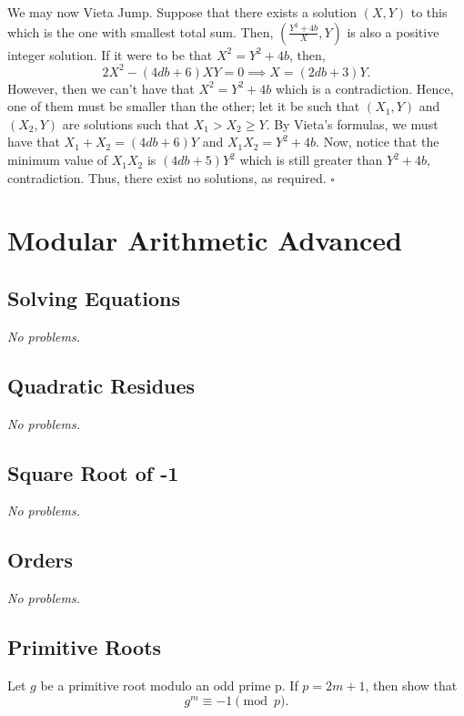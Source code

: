 \documentclass{article}
\newcommand{\noproblems}{\emph{No problems.}}
\begin{document}
We may now Vieta Jump. Suppose that there exists a solution $(X, Y)$ to this which is the one with smallest total sum. Then, $\left(\tfrac{Y^2+4b}{X}, Y\right)$ is also a positive integer solution. If it were to be that $X^2 = Y^2+4b$, then, \[2X^2-(4db+6)XY = 0 \implies X=(2db+3)Y.\] However, then we can't have that $X^2 = Y^2+4b$ which is a contradiction. Hence, one of them must be smaller than the other; let it be such that $(X_1, Y)$ and $(X_2, Y)$ are solutions such that $X_1 > X_2 \ge Y$. By Vieta's formulas, we must have that $X_1+X_2 = (4db+6)Y$ and $X_1X_2 = Y^2+4b$. Now, notice that the minimum value of $X_1X_2$ is $(4db+5)Y^2$ which is still greater than $Y^2+4b$, contradiction. Thus, there exist no solutions, as required. $\square$

\section{Modular Arithmetic Advanced}

\subsection{Solving Equations}

\noproblems

\subsection{Quadratic Residues}

\noproblems

\subsection{Square Root of -1}

\noproblems

\subsection{Orders}

\noproblems

\subsection{Primitive Roots}

\begin{problem}[5.5.1]{}
Let $g$ be a primitive root modulo an odd prime p. If $p = 2m+1$, then show that \[g^m \equiv -1 \pmod{p}.\]
\end{problem}
\end{document}
